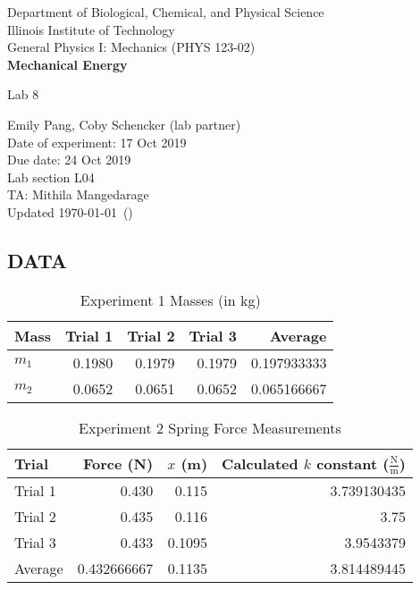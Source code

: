 \documentclass [12pt, letterpaper, twoside] {article}
\begin{document}
\begin {titlepage}
\begin {center}
Department of Biological, Chemical, and Physical Science\\
\vspace {0.1cm}
Illinois Institute of Technology\\
\vspace {0.1cm}
General Physics I: Mechanics (PHYS 123-02)\\
\vspace* {\fill}
\begingroup
\Large
\textbf {Mechanical Energy}
\vspace {0.35cm}

\normalsize
Lab 8
\vspace {1.5cm}
\endgroup
\vspace* {\fill}
\end {center}

\vspace*{\fill}
\begin {flushright}
\footnotesize
Emily Pang, Coby Schencker (lab partner)\\
Date of experiment: 17 Oct 2019\\
Due date: 24 Oct 2019\\
Lab section L04\\
TA: Mithila Mangedarage\\
Updated \usdate\today~(\currenttime)
\end {flushright}
\end {titlepage}

\subsection* {DATA}
  \begin {table}[h]
    \centering
    \begin {tabular} {| l | r | r | r | r |}
      \hline\hline
      Mass & Trial 1 & Trial 2 & Trial 3 & Average \\
      \hline
      \(m_{1}\) & 0.1980 & 0.1979 & 0.1979 & 0.197933333 \\
      \hline
      \(m_{2}\) & 0.0652 & 0.0651 & 0.0652 & 0.065166667 \\
      \hline\hline
    \end {tabular}
    \caption {Experiment 1 Masses (in kg)}
  \end {table}

\begin {table}[h]
  \centering
  \begin {tabular} {| l | r | r | r |}
    \hline\hline 
    Trial & Force (N) & \(x\) (m) & Calculated \(k\) constant (\(\tfrac{\text{N}}{\text{m}}\)) \\
    \hline
    Trial 1 & 0.430 & 0.115 & 3.739130435 \\
    \hline
    Trial 2 & 0.435 & 0.116 & 3.75 \\
    \hline
    Trial 3 & 0.433 & 0.1095 & 3.9543379 \\ 
    \hline
    Average & 0.432666667 & 0.1135 & 3.814489445 \\
    \hline\hline
  \end {tabular}
  \caption {Experiment 2 Spring Force Measurements}
\end {table}
\end{document}
